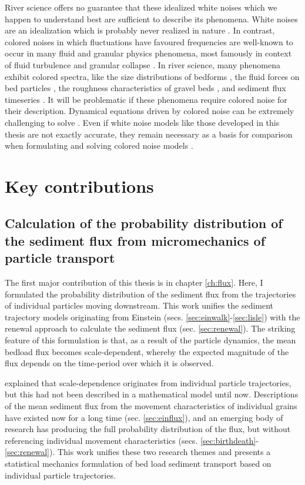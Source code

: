 River science offers no guarantee that these idealized white noises which we happen to understand best are sufficient to describe its phenomena.
White noises are an idealization which is probably never realized in nature \citep{Gardiner1983,Kubo1978}.
In contrast, colored noises in which fluctuations have favoured frequencies are well-known to occur in many fluid and granular physics phenomena, most famously in context of fluid turbulence \citep{Kolmogorov1941,Nikora2000} and granular collapse \citep{Bak1987,Jensen1998}.
In river science, many phenomena exhibit colored spectra, like the size distributions of bedforms \citep{Nikora1997,Guala2014}, the fluid forces on bed particles \citep{Dwivedi2011, Amir2014}, the roughness characteristics of gravel beds \citep{Aberle2006,Singh2012}, and sediment flux timeseries \citep{Dhont2018,Chartrand2021}.
It will be problematic if these phenomena require colored noise for their description. Dynamical equations driven by colored noise can be extremely challenging to solve \citep{Hanggi1978,Luczka2005,Hanggi2007}.
Even if white noise models like those developed in this thesis are not exactly accurate, they remain necessary as a basis for comparison when formulating and solving colored noise models \citep{Fox1986,Moss1989}.

\section{Key contributions}

\subsection{Calculation of the probability distribution of the sediment flux from micromechanics of particle transport}

The first major contribution of this thesis is in chapter \ref{ch:flux}. Here, I formulated the probability distribution of the sediment flux from the trajectories of individual particles moving downstream. This work unifies the sediment trajectory models originating from Einstein (secs. \ref{sec:einwalk}-\ref{sec:lisle}) with the renewal approach to calculate the sediment flux (sec. \ref{sec:renewal}).
The striking feature of this formulation is that, as a result of the particle dynamics, the mean bedload flux becomes scale-dependent, whereby the expected magnitude of the flux depends on the time-period over which it is observed.

\citet{Ballio2018} explained that scale-dependence originates from individual particle trajectories, but this had not been described in a mathematical model until now.
Descriptions of the mean sediment flux from the movement characteristics of individual grains have existed now for a long time (sec. \ref{sec:einflux}), and an emerging body of research has producing the full probability distribution of the flux, but without referencing individual movement characteristics (secs. \ref{sec:birthdeath}-\ref{sec:renewal}). 
This work unifies these two research themes and presents a statistical mechanics formulation of bed load sediment transport based on individual particle trajectories.

